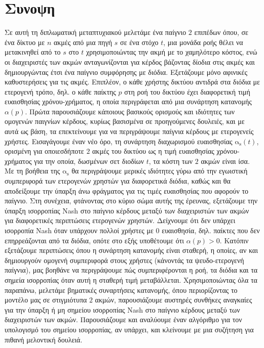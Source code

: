\documentclass[10pt,a4paper]{book}
\newcommand{\as}{\mathrm{\alpha_s}}
\theoremstyle{definition}
\theoremstyle{comment}
\begin{document}
\thispagestyle{empty}
\null
\clearpage

\thispagestyle{empty}

\chapter*{Συνοψη}
Σε αυτή τη διπλωματική μεταπτυχιακού μελετάμε ένα παίγνιο $2$ επιπέδων όπου, σε ένα δίκτυο με $n$ ακμές από μια πηγή $s$ σε ένα στόχο $t$, μια μονάδα ροής θέλει να μετακινηθεί από το $s$ στο $t$ χρησιμοποιώντας την ακμή με το χαμηλότερο κόστος, ενώ οι διαχειριστές των ακμών ανταγωνίζονται για κέρδος βάζοντας δίοδια στις ακμές και δημιουργώντας έτσι ένα παίγνιο συμφόρησης με διόδια.
Εξετάζουμε μόνο αφινικές καθυστερήσεις για τις ακμές.
Επιπλέον, ο κάθε χρήστης δικτύου αντιδρά στα διόδια με ετερογενή τρόπο, δηλ. ο κάθε παίκτης $p$ στη ροή του δικτύου έχει διαφορετική τιμή ευαισθησίας χρόνου-χρήματος, η οποία περιγράφεται από μια συνάρτηση κατανομής $\alpha(p)$.
Πρώτα παρουσιάζουμε κάποιους βασικούς ορισμούς και ιδιότητες των ομογενών παιγνίων κέρδους, κυρίως βασισμένα σε προηγούμενες δουλειές, και με αυτά ως βάση, τα επεκτείνουμε για να περιγράψουμε παίγνια κέρδους με ετερογενείς χρήστες.
Εισαγάγουμε έναν νέο όρο, τη συνάρτηση διαχωρισμού ευαισθησίας $\as(t)$, ορισμένη για οποιεσδήποτε $2$ ακμές του δικτύου ως η τιμή ευαισθησίας χρόνου-χρήματος για την οποία, δωσμένων σετ διοδίων $t$, τα κόστη των $2$ ακμών είναι ίσα.
Με τη βοήθεια της $\as$ θα περιγράψουμε μερικές ιδιότητες γύρω από την εγωιστική συμπεριφορά των ετερογενών χρηστών για διαφορετικά διόδια, καθώς και θα αποδείξουμε την ύπαρξη άνω φράγματος για τις τιμές ευαισθησίας που αφορούν το παίγνιο.
Στη συνέχεια, φτάνοντας στο κύριο σώμα αυτής της έρευνας, εξετάζουμε την ύπαρξη ισορροπίας Nash στο παίγνιο κέρδους μεταξύ των διαχειριστών των ακμών για διαφορετικές περιπτώσεις ετερογενών χρηστών.
Δείχνουμε ότι δεν υπάρχει ισορροπία Nash όταν υπάρχουν πολλοί χρήστες με $0$ ευαισθησία, δηλ. παίκτες που δεν επηρρεάζονται από τα διόδια, οπότε στο εξής υποθέτουμε ότι $\alpha(p) > 0$.
Κατόπιν εξετάζουμε περιπτώσεις όπου η συνάρτηση κατανομής είναι σταθερή, η οποίες, αν και δημιουργούν ομογενή συμπεριφορά στους χρήστες (κάνοντάς τα ψευδο-ετερογενή παίγνια), μας βοηθάνε να περιγράψουμε πώς συμπεριφέρονται η ροή, τα διόδια και τα σημεία ισορροπίας όταν αυτή η σταθερή τιμή μεταβάλλεται.
Χρησιμοποιώντας όλα τα παραπάνω, μελετάμε βηματικές συναρτήσεις κατανομής, όπου περιορίζοντας το μοντέλο μας σε στιγμιότυπα $2$ ακμών, παρουσιάζουμε αυστηρές συνθήκες αναγκαίες για την ύπαρξη ή μη σημείου ισορροπίας Nash στο παίγνιο κέρδους μεταξύ των διαχειριστών των ακμών.
Παρουσιάζουμε και αναλύουμε έναν αλγόριθμο για τον υπολογισμό του σημείου ισορροπίας, αν υπάρχει, και κλείνουμε με μια συζήτηση για πιθανή μελοντική δουλειά.
\end{document}
